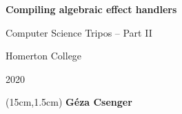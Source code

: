 \begin{titlepage}
    \begin{center}
        \vspace*{5cm}
    
        \textbf{\huge Compiling algebraic effect handlers}
    
        \vspace{0.5cm}
        {\Large Computer Science Tripos -- Part II}

        \vspace{0.5cm}
        {\Large Homerton College}
             
        \vspace{0.5cm}
        {\large 2020}

        \begin{textblock*}{5cm}(15cm,1.5cm) %
            \textbf{\Large Géza Csenger}
         \end{textblock*}
    \end{center}
\end{titlepage}